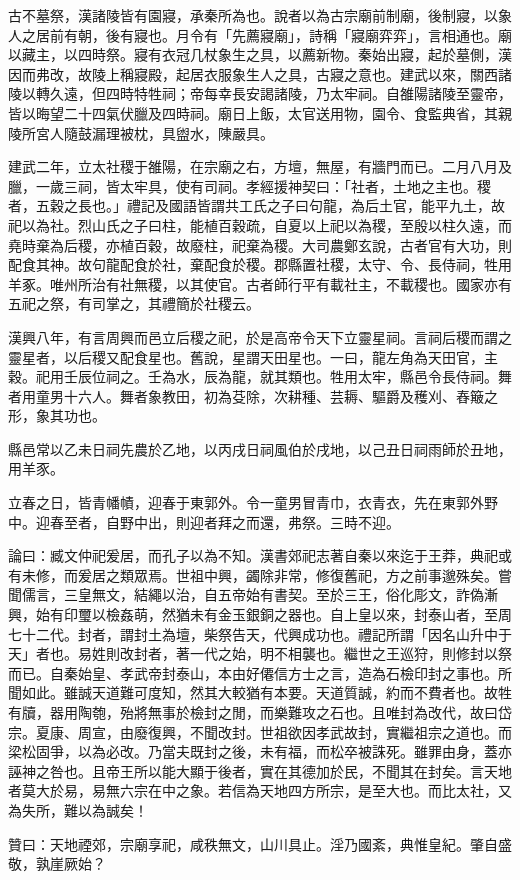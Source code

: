 \begin{pinyinscope}
古不墓祭，漢諸陵皆有園寢，承秦所為也。說者以為古宗廟前制廟，後制寢，以象人之居前有朝，後有寢也。月令有「先薦寢廟」，詩稱「寢廟弈弈」，言相通也。廟以藏主，以四時祭。寢有衣冠几杖象生之具，以薦新物。秦始出寢，起於墓側，漢因而弗改，故陵上稱寢殿，起居衣服象生人之具，古寢之意也。建武以來，關西諸陵以轉久遠，但四時特牲祠；帝每幸長安謁諸陵，乃太牢祠。自雒陽諸陵至靈帝，皆以晦望二十四氣伏臘及四時祠。廟日上飯，太官送用物，園令、食監典省，其親陵所宮人隨鼓漏理被枕，具盥水，陳嚴具。

建武二年，立太社稷于雒陽，在宗廟之右，方壇，無屋，有牆門而已。二月八月及臘，一歲三祠，皆太牢具，使有司祠。孝經援神契曰：「社者，土地之主也。稷者，五穀之長也。」禮記及國語皆謂共工氏之子曰句龍，為后土官，能平九土，故祀以為社。烈山氏之子曰柱，能植百穀疏，自夏以上祀以為稷，至殷以柱久遠，而堯時棄為后稷，亦植百穀，故廢柱，祀棄為稷。大司農鄭玄說，古者官有大功，則配食其神。故句龍配食於社，棄配食於稷。郡縣置社稷，太守、令、長侍祠，牲用羊豖。唯州所治有社無稷，以其使官。古者師行平有載社主，不載稷也。國家亦有五祀之祭，有司掌之，其禮簡於社稷云。

漢興八年，有言周興而邑立后稷之祀，於是高帝令天下立靈星祠。言祠后稷而謂之靈星者，以后稷又配食星也。舊說，星謂天田星也。一曰，龍左角為天田官，主穀。祀用壬辰位祠之。壬為水，辰為龍，就其類也。牲用太牢，縣邑令長侍祠。舞者用童男十六人。舞者象教田，初為芟除，次耕種、芸耨、驅爵及穫刈、舂簸之形，象其功也。

縣邑常以乙未日祠先農於乙地，以丙戌日祠風伯於戌地，以己丑日祠雨師於丑地，用羊豕。

立春之日，皆青幡幘，迎春于東郭外。令一童男冒青巾，衣青衣，先在東郭外野中。迎春至者，自野中出，則迎者拜之而還，弗祭。三時不迎。

論曰：臧文仲祀爰居，而孔子以為不知。漢書郊祀志著自秦以來迄于王莽，典祀或有未修，而爰居之類眾焉。世祖中興，蠲除非常，修復舊祀，方之前事邈殊矣。嘗聞儒言，三皇無文，結繩以治，自五帝始有書契。至於三王，俗化彫文，詐偽漸興，始有印璽以檢姦萌，然猶未有金玉銀銅之器也。自上皇以來，封泰山者，至周七十二代。封者，謂封土為壇，柴祭告天，代興成功也。禮記所謂「因名山升中于天」者也。易姓則改封者，著一代之始，明不相襲也。繼世之王巡狩，則修封以祭而已。自秦始皇、孝武帝封泰山，本由好僊信方士之言，造為石檢印封之事也。所聞如此。雖誠天道難可度知，然其大較猶有本要。天道質誠，約而不費者也。故牲有牘，器用陶匏，殆將無事於檢封之閒，而樂難攻之石也。且唯封為改代，故曰岱宗。夏康、周宣，由廢復興，不聞改封。世祖欲因孝武故封，實繼祖宗之道也。而梁松固爭，以為必改。乃當夫既封之後，未有福，而松卒被誅死。雖罪由身，蓋亦誣神之咎也。且帝王所以能大顯于後者，實在其德加於民，不聞其在封矣。言天地者莫大於易，易無六宗在中之象。若信為天地四方所宗，是至大也。而比太社，又為失所，難以為誠矣！

贊曰：天地禋郊，宗廟享祀，咸秩無文，山川具止。淫乃國紊，典惟皇紀。肇自盛敬，孰崖厥始？


\end{pinyinscope}
